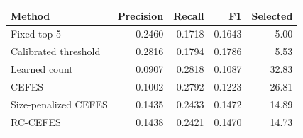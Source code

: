 \begin{tabular}{lrrrr}
\toprule
Method & Precision & Recall & F1 & Selected \\
\midrule
Fixed top-5 & 0.2460 & 0.1718 & 0.1643 & 5.00 \\
Calibrated threshold & 0.2816 & 0.1794 & 0.1786 & 5.53 \\
Learned count & 0.0907 & 0.2818 & 0.1087 & 32.83 \\
CEFES & 0.1002 & 0.2792 & 0.1223 & 26.81 \\
Size-penalized CEFES & 0.1435 & 0.2433 & 0.1472 & 14.89 \\
RC-CEFES & 0.1438 & 0.2421 & 0.1470 & 14.73 \\
\bottomrule
\end{tabular}
